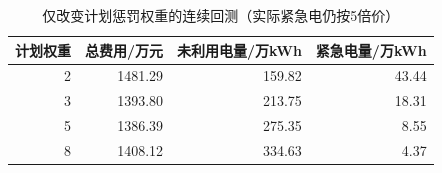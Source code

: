 \begin{table}[H]\centering\small
\caption{仅改变计划惩罚权重的连续回测（实际紧急电仍按5倍价）}\label{tab:review_risk}
\begin{tabular}{rrrr}\toprule
计划权重 & 总费用/万元 & 未利用电量/万kWh & 紧急电量/万kWh\\\midrule
2 & 1481.29 & 159.82 & 43.44\\
3 & 1393.80 & 213.75 & 18.31\\
5 & 1386.39 & 275.35 & 8.55\\
8 & 1408.12 & 334.63 & 4.37\\
\bottomrule\end{tabular}\end{table}
